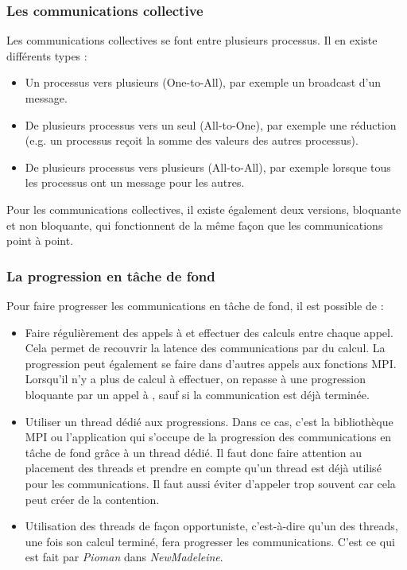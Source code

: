 \subsubsection{Les communications collective}

Les communications collectives se font entre plusieurs processus.
Il en existe différents types :
\begin{itemize}
  \item Un processus vers plusieurs (One-to-All), par exemple un broadcast d'un message.
  \item De plusieurs processus vers un seul (All-to-One), par exemple une réduction (e.g. un processus reçoit la somme des valeurs des autres processus).
  \item De plusieurs processus vers plusieurs (All-to-All), par exemple lorsque tous les processus ont un message pour les autres.
\end{itemize}
Pour les communications collectives, il existe également deux versions, bloquante et non bloquante, qui fonctionnent de la même façon que les communications point à point.

\subsubsection{La progression en tâche de fond}

Pour faire progresser les communications en tâche de fond, il est possible de :

\begin{itemize}
  \item Faire régulièrement des appels à  et effectuer des calculs entre chaque appel.
  Cela permet de recouvrir la latence des communications par du calcul.
  La progression peut également se faire dans d'autres appels aux fonctions MPI.
  Lorsqu'il n'y a plus de calcul à effectuer, on repasse à une progression bloquante par un appel à ,
  sauf si la communication est déjà terminée.
  \item Utiliser un thread dédié aux progressions.
  Dans ce cas, c'est la bibliothèque MPI ou l'application qui s'occupe de la progression des communications
  en tâche de fond grâce à un thread dédié.
  Il faut donc faire attention au placement des threads et prendre en compte qu'un thread est déjà utilisé pour les communications.
  Il faut aussi éviter d'appeler trop souvent  car cela peut créer de la contention.
  \item Utilisation des threads de façon opportuniste, c'est-à-dire qu'un des threads, une fois son calcul terminé, fera progresser les communications.
  C'est ce qui est fait par \emph{Pioman} dans \emph{NewMadeleine}.
\end{itemize}

